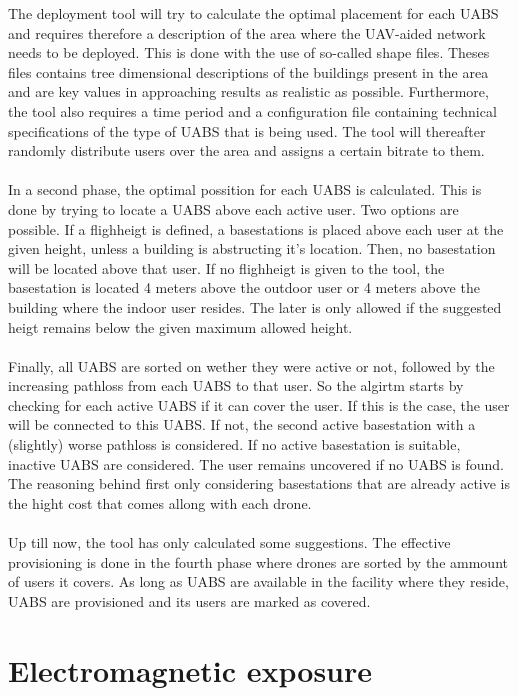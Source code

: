 The deployment tool will try to calculate the optimal placement for each \gls{UABS} and requires therefore a description of the area where the UAV-aided network needs to 
be deployed. This is done with the use of so-called shape files. Theses files contains tree dimensional descriptions of the buildings present in the area and are
key values in approaching results as realistic as possible. Furthermore, the tool also requires a time period and a configuration file containing technical specifications of the type of \gls{UABS} that is being used. 
The tool will thereafter randomly distribute users over the area and assigns a certain bitrate to them. \\
\\
In a second phase, the optimal possition for each \gls{UABS} is calculated. This is done by trying to locate a \gls{UABS} above each active user. Two options are possible.
If a flighheigt is defined, a basestations is placed above each user at the given height, unless a building is abstructing it's location. Then, no basestation will be located above that user.
If no flighheigt is given to the tool, the basestation is located 4 meters above the outdoor user or 4 meters above the building where the indoor user resides. 
The later is only allowed if the suggested heigt remains below the given maximum allowed height. \\
\\
Finally, all  \gls{UABS} are sorted on wether they were active or not, followed by the increasing pathloss from each \gls{UABS} to that user.
So the algirtm starts by checking for each active \gls{UABS} if it can cover the user. If this is the case, the user will be connected to this \gls{UABS}. If not,
the second active basestation with a (slightly) worse pathloss is considered. If no active basestation is suitable, inactive \gls{UABS} are considered. The user remains uncovered if no \gls{UABS}
is found. The reasoning behind first only considering basestations that are already active is the hight cost that comes allong with each drone. \\
\\
Up till now, the tool has only calculated some suggestions. The effective provisioning is done in the fourth phase where drones are sorted by the ammount of users it covers. As long as \gls{UABS}
are available in the facility where they reside, \gls{UABS} are provisioned and its users are marked as covered.


\section{Electromagnetic exposure}

